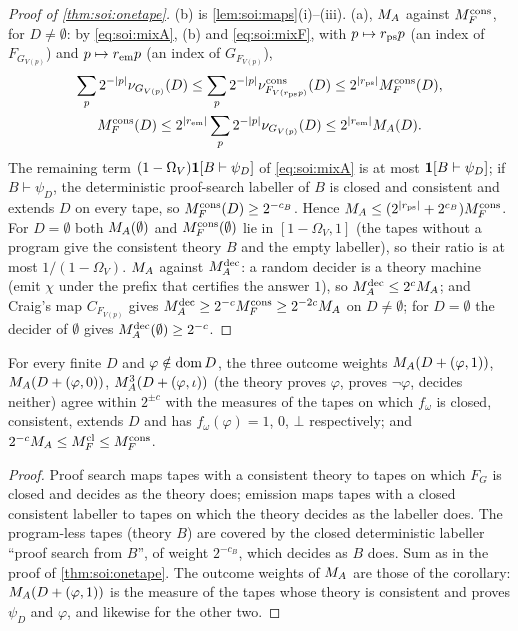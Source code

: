\begin{proof}[Proof of \cref{thm:soi:onetape}]
(b) is \cref{lem:soi:maps}(i)--(iii). (a), $M_{A}$ against $M_{F}^{\mathrm{cons}}$, for $D\ne\emptyset$: by \eqref{eq:soi:mixA}, (b) and \eqref{eq:soi:mixF}, with $p\mapsto r_{\rm ps}p$ (an index of $F_{G_{V(p)}}$) and $p\mapsto r_{\rm em}p$ (an index of $G_{F_{V(p)}}$),
\begin{gather*}
\sum_p2^{-\lvert p\rvert}\nu_{G_{V(p)}}(D)\le\sum_p2^{-\lvert p\rvert}\nu^{\mathrm{cons}}_{F_{V(r_{\rm ps}p)}}(D)\le2^{\lvert r_{\rm ps}\rvert}M_{F}^{\mathrm{cons}}(D),\\
M_{F}^{\mathrm{cons}}(D)\le2^{\lvert r_{\rm em}\rvert}\sum_p2^{-\lvert p\rvert}\nu_{G_{V(p)}}(D)\le2^{\lvert r_{\rm em}\rvert}M_{A}(D).
\end{gather*}
The remaining term $(1-\Omega_V)\mathbf{1}[B\vdash\psi_D]$ of \eqref{eq:soi:mixA} is at most $\mathbf{1}[B\vdash\psi_D]$; if $B\vdash\psi_D$, the deterministic proof-search labeller of $B$ is closed and consistent and extends $D$ on every tape, so $M_{F}^{\mathrm{cons}}(D)\ge2^{-c_B}$. Hence $M_{A}\le(2^{\lvert r_{\rm ps}\rvert}+2^{c_B})M_{F}^{\mathrm{cons}}$. For $D=\emptyset$ both $M_{A}(\emptyset)$ and $M_{F}^{\mathrm{cons}}(\emptyset)$ lie in $[1-\Omega_V,1]$ (the tapes without a program give the consistent theory $B$ and the empty labeller), so their ratio is at most $1/(1-\Omega_V)$.
$M_{A}$ against $M_{A}^{\mathrm{dec}}$: a random decider is a theory machine (emit $\chi$ under the prefix that certifies the answer $1$), so $M_{A}^{\mathrm{dec}}\le2^cM_{A}$; and Craig's map $C_{F_{V(p)}}$ gives $M_{A}^{\mathrm{dec}}\ge2^{-c}M_{F}^{\mathrm{cons}}\ge2^{-2c}M_{A}$ on $D\ne\emptyset$; for $D=\emptyset$ the decider of $\emptyset$ gives $M_{A}^{\mathrm{dec}}(\emptyset)\ge2^{-c}$.
\end{proof}

\begin{corollary}\label{cor:soi:closed}
For every finite $D$ and $\varphi\notin\operatorname{dom} D$, the three outcome weights $M_{A}(D+(\varphi,1))$, $M_{A}(D+(\varphi,0))$, $M_{A}^{3}(D+(\varphi,\iota))$ (the theory proves $\varphi$, proves $\neg\varphi$, decides neither) agree within $2^{\pm c}$ with the measures of the tapes on which $f_\omega$ is closed, consistent, extends $D$ and has $f_\omega(\varphi)=1$, $0$, $\bot$ respectively; and $2^{-c}M_{A}\le M_{F}^{\mathrm{cl}}\le M_{F}^{\mathrm{cons}}$.
\end{corollary}

\begin{proof}
Proof search maps tapes with a consistent theory to tapes on which $F_G$ is closed and decides as the theory does; emission maps tapes with a closed consistent labeller to tapes on which the theory decides as the labeller does. The program-less tapes (theory $B$) are covered by the closed deterministic labeller ``proof search from $B$'', of weight $2^{-c_B}$, which decides as $B$ does. Sum as in the proof of \cref{thm:soi:onetape}. The outcome weights of $M_{A}$ are those of the corollary: $M_{A}(D+(\varphi,1))$ is the measure of the tapes whose theory is consistent and proves $\psi_D$ and $\varphi$, and likewise for the other two.
\end{proof}

